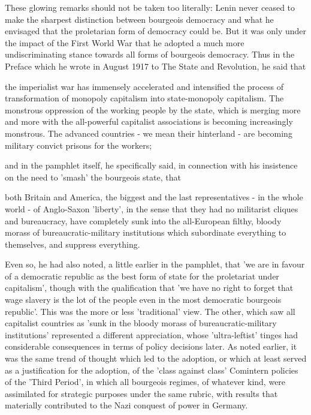 These glowing remarks should not be taken too literally: Lenin never ceased to make the sharpest distinction between bourgeois democracy and what he envisaged that the proletarian form of democracy could be. But it was only under the impact of the First World War that he adopted a much more undiscriminating stance towards all forms of bourgeois democracy. Thus in the Preface which he wrote in August 1917 to The State and Revolution, he said that
\begin{displayquote}
    the imperialist war has immensely accelerated and intensified the process of transformation of monopoly capitalism into state-monopoly capitalism. The monstrous oppression of the working people by the state, which is merging more and more with the all-powerful capitalist associations is becoming increasingly monstrous. The advanced countries - we mean their hinterland - are becoming military convict prisons for the workers;
\end{displayquote}

and in the pamphlet itself, he specifically said, in connection with his insistence on the need to 'smash' the bourgeois state, that
\begin{displayquote}
    both Britain and America, the biggest and the last representatives - in the whole world - of Anglo-Saxon 'liberty', in the sense that they had no militarist cliques and bureaucracy, have completely sunk into the all-European filthy, bloody morass of bureaucratic-military institutions which subordinate everything to themselves, and suppress everything.
\end{displayquote}

Even so, he had also noted, a little earlier in the pamphlet, that 'we are in favour of a democratic republic as the best form of state for the proletariat under capitalism', though with the qualification that 'we have no right to forget that wage slavery is the lot of the people even in the most democratic bourgeois republic'. This was the more or less 'traditional' view. The other, which saw all capitalist countries as 'sunk in the bloody morass of bureaucratic-military institutions' represented a different appreciation, whose 'ultra-leftist' tinges had considerable consequences in terms of policy decisions later. As noted earlier, it was the same trend of thought which led to the adoption, or which at least served as a justification for the adoption, of the 'class against class' Comintern policies of the 'Third Period', in which all bourgeois regimes, of whatever kind, were assimilated for strategic purposes under the same rubric, with results that materially contributed to the Nazi conquest of power in Germany.

